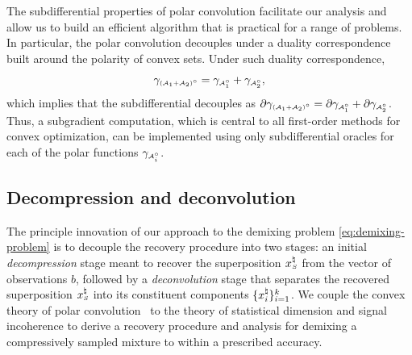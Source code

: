 The subdifferential properties of polar convolution facilitate our analysis and allow us to build an efficient algorithm that is practical for a range of problems. In particular, the polar convolution decouples under a duality correspondence built around the polarity of convex sets. Under such duality correspondence,
\[
  \gamma_{\scriptscriptstyle(\mathcal{A}_1+\mathcal{A}_2)^\circ}
  = \gamma_{\scriptscriptstyle\mathcal{A}_1^\circ} + \gamma_{\scriptscriptstyle\mathcal{A}_2^\circ},
\]
which implies that the subdifferential decouples as 
$\partial \gamma_{\scriptscriptstyle(\mathcal{A}_1+\mathcal{A}_2)^\circ} = \partial\gamma_{\scriptscriptstyle\mathcal{A}_1^\circ}+\partial\gamma_{\scriptscriptstyle\mathcal{A}_2^\circ}$. Thus, a subgradient computation, which is central to all first-order methods for convex optimization, can be implemented using only subdifferential oracles for each of the polar functions $\gamma_{\scriptscriptstyle\mathcal{A}_i^\circ}$. 

\subsection{Decompression and deconvolution} \label{sec:3-1-2}

The principle innovation of our approach to the demixing problem \eqref{eq:demixing-problem} is to decouple the recovery procedure into two stages: an initial \emph{decompression} stage meant to recover the superposition $x_{\scriptscriptstyle S}^\natural$ from the vector of observations $b$, followed by a \emph{deconvolution} stage that separates the recovered superposition $x_{\scriptscriptstyle S}^\natural$ into its constituent components $\{x_i^{\natural}\}_{i=1}^k$. We couple the convex theory of polar convolution~\cite{friedlander2019polarconvolution} to the theory of statistical dimension and signal incoherence to derive a recovery procedure and analysis for demixing a compressively sampled mixture to within a prescribed accuracy.

